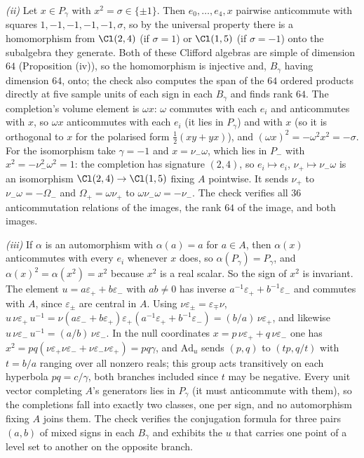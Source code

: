 \emph{(ii)} Let $x \in P_{\gamma}$ with $x^{2} = \sigma \in \{\pm 1\}$. Then $e_{0}, \ldots, e_{4}, x$ pairwise anticommute with squares $1, -1, -1, -1, -1, \sigma$, so by the universal property there is a homomorphism from $\Cl(2,4)$ (if $\sigma = 1$) or $\Cl(1,5)$ (if $\sigma = -1$) onto the subalgebra they generate. Both of these Clifford algebras are simple of dimension $64$ (Proposition (iv)), so the homomorphism is injective and, $B_{\gamma}$ having dimension $64$, onto; the check also computes the span of the $64$ ordered products directly at five sample units of each sign in each $B_{\gamma}$ and finds rank $64$. The completion's volume element is $\omega x$: $\omega$ commutes with each $e_{i}$ and anticommutes with $x$, so $\omega x$ anticommutes with each $e_{i}$ (it lies in $P_{\gamma}$) and with $x$ (so it is orthogonal to $x$ for the polarised form $\tfrac12(xy + yx)$), and $(\omega x)^{2} = -\omega^{2}x^{2} = -\sigma$. For the isomorphism take $\gamma = -1$ and $x = \nu_{-}\omega$, which lies in $P_{-}$ with $x^{2} = -\nu_{-}^{2}\omega^{2} = 1$: the completion has signature $(2,4)$, so $e_{i} \mapsto e_{i}$, $\nu_{+} \mapsto \nu_{-}\omega$ is an isomorphism $\Cl(2,4) \to \Cl(1,5)$ fixing $A$ pointwise. It sends $\nu_{+}$ to $\nu_{-}\omega = -\Omega_{-}$ and $\Omega_{+} = \omega\nu_{+}$ to $\omega\nu_{-}\omega = -\nu_{-}$. The check verifies all $36$ anticommutation relations of the images, the rank $64$ of the image, and both images.

\emph{(iii)} If $\alpha$ is an automorphism with $\alpha(a) = a$ for $a \in A$, then $\alpha(x)$ anticommutes with every $e_{i}$ whenever $x$ does, so $\alpha(P_{\gamma}) = P_{\gamma}$, and $\alpha(x)^{2} = \alpha(x^{2}) = x^{2}$ because $x^{2}$ is a real scalar. So the sign of $x^{2}$ is invariant. The element $u = a\varepsilon_{+} + b\varepsilon_{-}$ with $ab \neq 0$ has inverse $a^{-1}\varepsilon_{+} + b^{-1}\varepsilon_{-}$ and commutes with $A$, since $\varepsilon_{\pm}$ are central in $A$. Using $\nu\varepsilon_{\pm} = \varepsilon_{\mp}\nu$, $u\,\nu\varepsilon_{+}\,u^{-1} = \nu(a\varepsilon_{-} + b\varepsilon_{+})\varepsilon_{+}(a^{-1}\varepsilon_{+} + b^{-1}\varepsilon_{-}) = (b/a)\,\nu\varepsilon_{+}$, and likewise $u\,\nu\varepsilon_{-}\,u^{-1} = (a/b)\,\nu\varepsilon_{-}$. In the null coordinates $x = p\,\nu\varepsilon_{+} + q\,\nu\varepsilon_{-}$ one has $x^{2} = pq(\nu\varepsilon_{+}\nu\varepsilon_{-} + \nu\varepsilon_{-}\nu\varepsilon_{+}) = pq\gamma$, and $\mathrm{Ad}_{u}$ sends $(p, q)$ to $(tp, q/t)$ with $t = b/a$ ranging over all nonzero reals; this group acts transitively on each hyperbola $pq = c/\gamma$, both branches included since $t$ may be negative. Every unit vector completing $A$'s generators lies in $P_{\gamma}$ (it must anticommute with them), so the completions fall into exactly two classes, one per sign, and no automorphism fixing $A$ joins them. The check verifies the conjugation formula for three pairs $(a,b)$ of mixed signs in each $B_{\gamma}$ and exhibits the $u$ that carries one point of a level set to another on the opposite branch.

